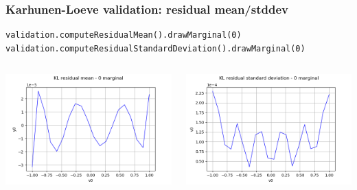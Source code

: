 \documentclass{beamer}
\begin{document}
\begin{frame}[containsverbatim]
\frametitle{Karhunen-Loeve validation: residual mean/stddev}
% 
% 
\begin{lstlisting}
validation.computeResidualMean().drawMarginal(0)
validation.computeResidualStandardDeviation().drawMarginal(0)
\end{lstlisting}

\begin{columns}
\begin{center}
\includegraphics[width=1.0\textwidth]{figures/kl2.png}
\end{center}
\begin{center}
\includegraphics[width=1.0\textwidth]{figures/kl3.png}
\end{center}
\end{columns}
\end{frame}
\end{document}
